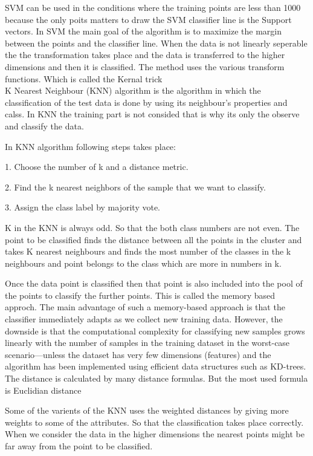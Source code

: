 \documentclass[conference,compsoc]{IEEEtran}
\begin{document}
SVM can be used in the conditions
where the training points are less than 1000
because the only poits matters to draw the SVM
classifier line is the Support vectors. In SVM
the main goal of the algorithm is to maximize
the margin between the points and the classifier
line. When the data is not linearly seperable
the the transformation takes place and the data is
transferred to the higher dimensions and then it
is classified. The method uses the various
transform functions. Which is called the Kernal
trick\\

K Nearest Neighbour (KNN) algorithm
is the algorithm in which the classification of
the test data is done by using its neighbour’s
properties and calss. In KNN the training part is
not consided that is why its only the observe and
classify the data.

In KNN algorithm following steps takes
place:

1. Choose the number of k and a distance
metric.

2. Find the k nearest neighbors of the sample
that we want to classify.

3. Assign the class label by majority vote.

K in the KNN is always odd. So that the
both class numbers are not even.
The point to be classified finds the
distance between all the points in the cluster and
takes K nearest neighbours and finds the most
number of the classes in the k neighbours and
point belongs to the class which are more in
numbers in k.

Once the data point is classified then that
point is also included into the pool of the points
to classify the further points. This is called the
memory based approch. The main advantage of
such a memory-based approach is that the
classifier immediately adapts as we collect new
training data. However, the downside is that
the computational complexity for classifying
new samples grows linearly with the number of
samples in the training dataset in the worst-case
scenario—unless the dataset has very few
dimensions (features) and the algorithm has
been implemented using efficient data structures
such as KD-trees.
The distance is calculated by many
distance formulas. But the most used formula is
Euclidian distance

Some of the varients of the KNN uses the
weighted distances by giving more weights to
some of the attributes. So that the classification
takes place correctly.
When we consider the data in the higher
dimensions the nearest points might be far away
from the point to be classified.\\
\end{document}
